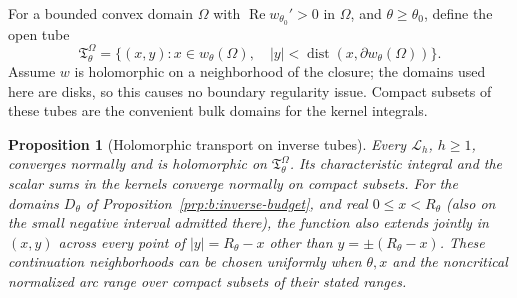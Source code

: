 \documentclass[a4paper,10pt]{article}
\numberwithin{equation}{section}
\theoremstyle{paperplain}
\newtheorem{prp}[thm]{Proposition}
\theoremstyle{paperremark}
\theoremstyle{paperplain}
\begin{document}
For a bounded convex domain $\Omega$ with
$\operatorname{Re}w_{\theta_0}'>0$ in $\Omega$, and
$\theta\geq\theta_0$, define the open tube
\begin{equation}\label{eq:b:tube}
 \mathfrak T_\theta^\Omega
 =\{(x,y):x\in w_\theta(\Omega),\quad
       |y|<\operatorname{dist}(x,\partial w_\theta(\Omega))\}.
\end{equation}
Assume $w$ is holomorphic on a neighborhood of the closure; the
domains used here are disks, so this causes no boundary regularity
issue. Compact subsets of these tubes are the convenient bulk
domains for the kernel integrals.

\begin{prp}[Holomorphic transport on inverse tubes]\label{prp:b:tube}
Every $\mathcal L_h$, $h\geq1$, converges normally and is
holomorphic on $\mathfrak T_\theta^\Omega$. Its characteristic
integral and the scalar sums in the kernels converge normally on
compact subsets. For the domains $D_\theta$ of
Proposition~\ref{prp:b:inverse-budget}, and real $0\leq x<R_\theta$
(also on the small negative interval admitted there),
the function also extends jointly in $(x,y)$ across every point of
$|y|=R_\theta-x$ other than $y=\pm(R_\theta-x)$.
These continuation neighborhoods can be chosen uniformly when
$\theta,x$ and the noncritical normalized arc range over compact
subsets of their stated ranges.
\end{prp}
\end{document}
